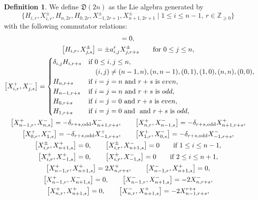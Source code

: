 \documentclass[10pt,a4paper]{amsart}
\numberwithin{equation}{section}
\theoremstyle{definition}
\newtheorem{Definition}[Theorem]{Definition}
\begin{document}
\begin{Definition}
We define $\mathfrak{D}(2n)$ as the Lie algebra generated by
\begin{equation*}
\bigl\{H_{i,r},X^\pm_{i,r},H_{n,2r},H_{0,2r},X^\pm_{-1,2r+1},X^\pm_{n+1,2r+1} \mid 1\leq i\leq n-1,\, r\in\mathbb{Z}_{\geq0}\bigr\}
\end{equation*}
with the following commutator relations:
\begin{gather}
[H_{i,r},H_{j,s}]=0, \label{5111}\\
\bigl[H_{i,r},X^\pm_{j,s}\bigr]=\pm a^r_{i,j}X^\pm_{j,r+s}\qquad \text{for }0\leq j\leq n,\label{5112}\\
\bigl[X^+_{i,r},X^-_{j,s}\bigr]=\begin{cases}
\delta_{i,j}H_{i,r+s}& \text{if} \ 0\leq i,j\leq n,\\
& \hphantom{\text{for}}\! (i,j)\neq(n-1,n),(n,n-1),(0,1),(1,0),(n,n),(0,0),\\
H_{n,r+s}& \text{if }i=j=n\text{ and }r+s\text{ is }even,\\
H_{n-1,r+s}& \text{if }i=j=n\text{ and }r+s\text{ is }odd,\\
H_{0,r+s}& \text{if }i=j=0\text{ and }r+s\text{ is }even,\\
H_{1,r+s}& \text{if }i=j=0\text{ and }\text{ and }r+s\text{ is }odd,
\end{cases}\!\!\! \label{5113}\\
\bigl[X^+_{n-1,r},X^-_{n,s}\bigr]=-\delta_{r+s,{\rm odd}}X^-_{n+1,r+s},\qquad \bigl[X^+_{n,r},X^-_{n-1,s}\bigr]=-\delta_{r+s,{\rm odd}}X^+_{n+1,r+s},\label{5114}\\
\bigl[X^+_{0,r},X^-_{1,s}\bigr]=-\delta_{r+s,{\rm odd}}X^+_{-1,r+s},\qquad \bigl[X^+_{1,r},X^-_{0,s}\bigr]=-\delta_{r+s,{\rm odd}}X^-_{-1,r+s}, \label{5115}\\
\bigl[X^\pm_{i,r},X^+_{n+1,s}\bigr]=0,\qquad\bigl[X^\pm_{i,r},X^-_{n+1,s}\bigr]=0 \qquad\text{if }1\leq i\leq n-1, \label{5116}\\
\bigl[X^\pm_{i,r},X^+_{-1,s}\bigr]=0,\qquad\bigl[X^\pm_{i,r},X^-_{-1,s}\bigr]=0 \qquad\text{if }2\leq i\leq n+1,\label{5117}\\
\bigl[X^+_{n-1,r},X^+_{n+1,s}\bigr]=2X^+_{n,r+s},\qquad \bigl[X^-_{n-1,r},X^+_{n+1,s}\bigr]=0,\label{5118}\\
\bigl[X^+_{n-1,r},X^-_{n+1,s}\bigr]=0,\qquad \bigl[X^-_{n-1,r},X^-_{n+1,s}\bigr]=-2X^-_{n,r+s},\label{5119}\\
\bigl[X^+_{n,r},X^+_{n+1,s}\bigr]=0,\qquad \bigl[X^-_{n,r},X^+_{n+1,s}\bigr]=-2X^{r+s}_{n-1,r+s}, \label{5120}\\

\end{gather}
\end{Definition}
\end{document}
